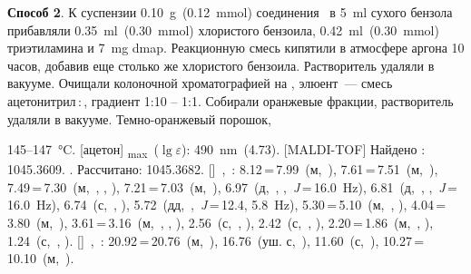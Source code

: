 \textbf{Способ 2}. К суспензии \SI{0.10}{\gram}~(\SI{0.12}{\mmol}) соединения~\textbf{} в \SI{5}{\milli\litre} сухого бензола прибавляли \SI{0.35}{\milli\litre}~(\SI{0.30}{\mmol}) хлористого бензоила, \SI{0.42}{\milli\litre}~(\SI{0.30}{\mmol}) триэтиламина и \SI{7}{\milli\gram} \ac{dmap}.
Реакционную смесь кипятили в атмосфере аргона 10 часов, добавив еще столько же хлористого бензоила.
Растворитель удаляли в вакууме. Очищали колоночной хроматографией на , элюент~--- смесь ацетонитрил\,:\,, градиент 1:10 -- 1:1.
Собирали оранжевые фракции, растворитель удаляли в вакууме. Темно-оранжевый порошок, 
\begin{experimental}
     145--\SI{147}{\celsius}.
    [ацетон] \chemlambda\textsubscript{max}~($\lg \varepsilon$): \SI{490}{\nano\metre}~(4.73).
    [MALDI-TOF] Найдено \ce{[M + H]+}: \num{1045.3609}. . Рассчитано: \ce{[M + H]} \num{1045.3682}.
    []~\chemdelta,~\si{\ppm}: 8.12\,=\,7.99~(м,~), 7.61\,=\,7.51~(м,~), 7.49\,=\,7.30~(м,~, , ), 7.21\,=\,7.03~(м,~), 6.97~(д,~, ,~\textit{J}\,=\,16.0~\si{\hertz}), 6.81~(д,~, ,~\textit{J}\,=\,16.0~\si{\hertz}), 6.74~(с,~, ), 5.72~(дд,~,~\textit{J}\,=\,12.4, 5.8~\si{\hertz}), 5.30\,=\,5.10~(м,~, ), 4.04\,=\,3.80~(м,~), 3.61\,=\,3.16~(м,~, , ), 2.56~(с,~, ), 2.42~(с,~, ), 2.20\,=\,1.86~(м,~, ), 1.24~(с,~, ).
    []~\chemdelta,~\si{\ppm}: 20.92\,=\,20.76~(м,~), 16.76~(уш. с,~), 11.60~(с,~), 10.27\,=\,10.10~(м,~).
\end{experimental}

